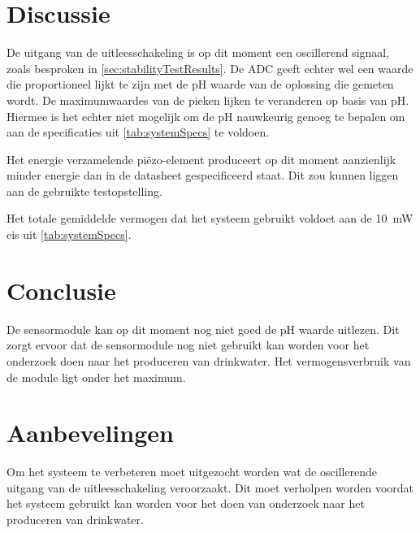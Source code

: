 \section{Discussie}
De uitgang van de uitleesschakeling is op dit moment een oscillerend signaal, zoals besproken in \cref{sec:stabilityTestResults}. De ADC geeft echter wel een waarde die proportioneel lijkt te zijn met de pH waarde van de oplossing die gemeten wordt.
De maximumwaardes van de pieken lijken te veranderen op basis van pH. Hiermee is het echter niet mogelijk om de pH nauwkeurig genoeg te bepalen om aan de specificaties uit \cref{tab:systemSpecs} te voldoen.

Het energie verzamelende piëzo-element produceert op dit moment aanzienlijk minder energie dan in de datasheet gespecificeerd staat. Dit zou kunnen liggen aan de gebruikte testopstelling.

Het totale gemiddelde vermogen dat het systeem gebruikt voldoet aan de \qty{10}{\milli\watt} eis uit \cref{tab:systemSpecs}.

\newpage
\section{Conclusie}
De sensormodule kan op dit moment nog niet goed de pH waarde uitlezen. Dit zorgt ervoor dat de sensormodule nog niet gebruikt kan worden voor het onderzoek doen naar het produceren van drinkwater. Het vermogensverbruik van de module ligt onder het maximum.


\newpage
\section{Aanbevelingen}
Om het systeem te verbeteren moet uitgezocht worden wat de oscillerende uitgang van de uitleesschakeling veroorzaakt. Dit moet verholpen worden voordat het systeem gebruikt kan worden voor het doen van onderzoek naar het produceren van drinkwater.

